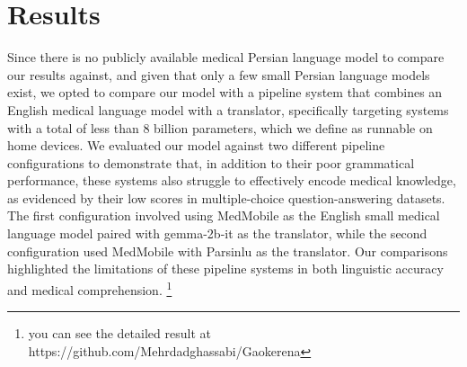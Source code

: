 \documentclass[conference]{IEEEtran}
\begin{document}
\section{Results}
Since there is no publicly available medical Persian language model to compare our results against, and given that only a few small Persian language models exist, we opted to compare our model with a pipeline system that combines an English medical language model with a translator, specifically targeting systems with a total of less than 8 billion parameters, which we define as runnable on home devices. We evaluated our model against two different pipeline configurations to demonstrate that, in addition to their poor grammatical performance, these systems also struggle to effectively encode medical knowledge, as evidenced by their low scores in multiple-choice question-answering datasets. The first configuration involved using MedMobile
\cite{b9}
as the English small medical language model paired with gemma-2b-it
\cite{b14}
as the translator, while the second configuration used MedMobile with Parsinlu
\cite{b15}
\cite{b16}
as the translator. Our comparisons highlighted the limitations of these pipeline systems in both linguistic accuracy and medical comprehension.
\footnote{
	you can see the detailed result at https://github.com/Mehrdadghassabi/Gaokerena
}
\end{document}
